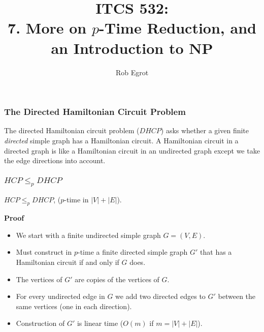\documentclass[handout]{beamer}
\title{ITCS 532:\\ 
7. More on $p$-Time Reduction, and an Introduction to $\mathbf{NP}$}
\date{}
\author{Rob Egrot}
\begin{document}
\begin{frame}
\titlepage
\end{frame}


\begin{frame}
\frametitle{The Directed Hamiltonian Circuit Problem}
\begin{definition}[DHCP]
The directed Hamiltonian circuit problem ($DHCP$) asks whether a given finite \emph{directed} simple graph has a Hamiltonian circuit. A Hamiltonian circuit in a directed graph is like a Hamiltonian circuit in an undirected graph except we take the edge directions into account. 
\end{definition}
\end{frame}

\begin{frame}
\frametitle{$HCP\leq_p DHCP$}
\begin{theorem}
$HCP\leq_p DHCP$, ($p$-time in $|V|+|E|$).
\end{theorem}
\vspace{0.3cm}
\textbf{Proof}
\begin{itemize}
\item We start with a finite undirected simple graph $G=(V,E)$. 
\vspace{0.3cm}
\item Must construct in $p$-time a finite directed simple graph $G'$ that has a Hamiltonian circuit if and only if $G$ does. 
\vspace{0.3cm}
\item The vertices of $G'$ are copies of the vertices of $G$.
\vspace{0.3cm}
\item For every undirected edge in $G$ we add two directed edges to $G'$ between the same vertices (one in each direction). 
\vspace{0.3cm}
\item Construction of $G'$ is linear time ($O(m)$ if $m=|V|+|E|$). 
\end{itemize} 
\end{frame}
\end{document}
